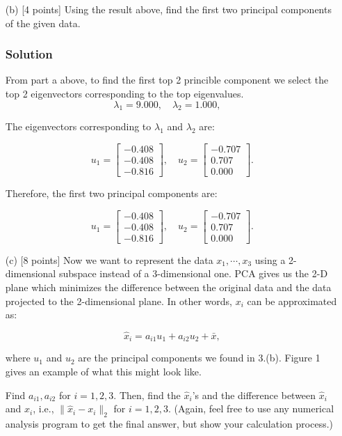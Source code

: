 \documentclass{article}
\begin{document}
\begin{enumerate}
    \item[(b)] [4 points] Using the result above, find the first two principal components of the given data.
    \subsubsection*{Solution}
    From part a above, to find the first top 2 princible component we select the top 2 eigenvectors corresponding to the top eigenvalues. 
    \[
    \lambda_1 = 9.000, \quad \lambda_2 = 1.000, \quad 
    \]

    The eigenvectors corresponding to \(\lambda_1\) and \(\lambda_2\) are:

    \[
    u_1 = \begin{bmatrix} -0.408 \\ -0.408 \\ -0.816 \end{bmatrix}, \quad
    u_2 = \begin{bmatrix} -0.707 \\ 0.707 \\ 0.000 \end{bmatrix}.
    \]

    Therefore, the first two principal components are:

    \[
    u_1 = \begin{bmatrix} -0.408 \\ -0.408 \\ -0.816 \end{bmatrix}, \quad
    u_2 = \begin{bmatrix} -0.707 \\ 0.707 \\ 0.000 \end{bmatrix}.
    \]


    \item[(c)] [8 points] Now we want to represent the data $x_1, \cdots, x_3$ using a 2-dimensional subspace instead of a 3-dimensional one. PCA gives us the 2-D plane which minimizes the difference between the original data and the data projected to the 2-dimensional plane. In other words, $x_i$ can be approximated as:
    

\[
    \hat{x}_i = a_{i1}u_1 + a_{i2}u_2 + \bar{x},
    \]


    where $u_1$ and $u_2$ are the principal components we found in 3.(b). Figure 1 gives an example of what this might look like.

    Find $a_{i1}, a_{i2}$ for $i = 1, 2, 3$. Then, find the $\hat{x}_i$'s and the difference between $\hat{x}_i$ and $x_i$, i.e., $\|\hat{x}_i - x_i\|_2$ for $i = 1, 2, 3$. (Again, feel free to use any numerical analysis program to get the final answer, but show your calculation process.)


\end{enumerate}
\end{document}
